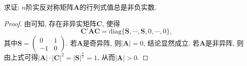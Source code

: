 \documentclass[../../main.tex]{subfiles}%
\begin{document}
\begin{proposition}\label{proposition:实反称矩阵的行列式必非负}
求证: $n$阶实反对称矩阵$\boldsymbol{A}$的行列式值总是非负实数.
\end{proposition}
\begin{proof}

由可知, 存在非异实矩阵$\boldsymbol{C}$, 使得
\[
\boldsymbol{C}'\boldsymbol{A}\boldsymbol{C}=\text{diag}\{\boldsymbol{S}, \cdots, \boldsymbol{S}, 0, \cdots, 0\},
\]
其中$\boldsymbol{S}=\begin{pmatrix}
0 & 1 \\
-1 & 0
\end{pmatrix}$. 若$\boldsymbol{A}$是奇异阵, 则$|\boldsymbol{A}| = 0$, 结论显然成立. 若$\boldsymbol{A}$是非异阵, 则由上式可得$|\boldsymbol{A}|\cdot|\boldsymbol{C}|^2 = |\boldsymbol{S}|^{\frac{n}{2}} = 1$, 从而$|\boldsymbol{A}|>0$. 

\end{proof}
\end{document}
